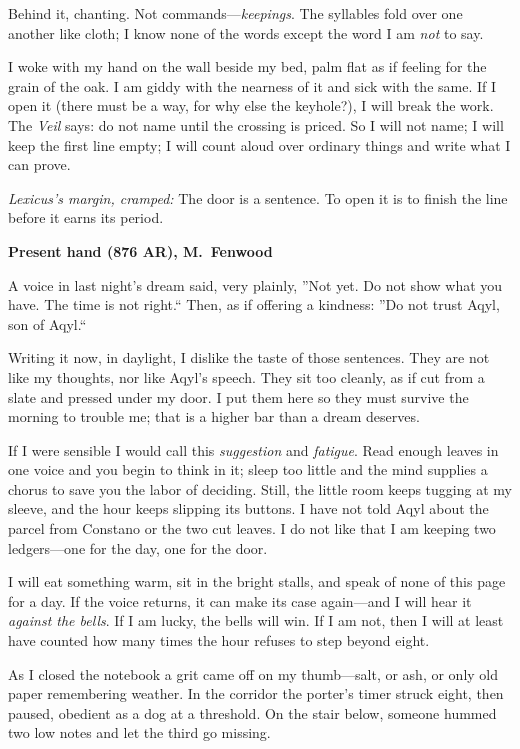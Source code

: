 \documentclass[11pt]{article}
\numberwithin{equation}{section} %
\theoremstyle{plain} %
\theoremstyle{definition} %
\theoremstyle{remark} %
\begin{document}
Behind it, chanting. Not commands---\emph{keepings}. The syllables fold over one another like cloth; I know none of the words except the word I am \emph{not} to say.

I woke with my hand on the wall beside my bed, palm flat as if feeling for the grain of the oak. I am giddy with the nearness of it and sick with the same. If I open it (there must be a way, for why else the keyhole?), I will break the work. The \textit{Veil} says: do not name until the crossing is priced. So I will not name; I will keep the first line empty; I will count aloud over ordinary things and write what I can prove.

\medskip
\noindent\textit{Lexicus's margin, cramped:} The door is a sentence. To open it is to finish the line before it earns its period.

\medskip
\noindent\textbf{Present hand (876 AR), M.\ Fenwood}

A voice in last night's dream said, very plainly, ''Not yet. Do not show what you have. The time is not right.`` Then, as if offering a kindness: ''Do not trust Aqyl, son of Aqyl.``

Writing it now, in daylight, I dislike the taste of those sentences. They are not like my thoughts, nor like Aqyl's speech. They sit too cleanly, as if cut from a slate and pressed under my door. I put them here so they must survive the morning to trouble me; that is a higher bar than a dream deserves.

If I were sensible I would call this \emph{suggestion} and \emph{fatigue}. Read enough leaves in one voice and you begin to think in it; sleep too little and the mind supplies a chorus to save you the labor of deciding. Still, the little room keeps tugging at my sleeve, and the hour keeps slipping its buttons. I have not told Aqyl about the parcel from Constano or the two cut leaves. I do not like that I am keeping two ledgers---one for the day, one for the door.

I will eat something warm, sit in the bright stalls, and speak of none of this page for a day. If the voice returns, it can make its case again---and I will hear it \emph{against the bells}. If I am lucky, the bells will win. If I am not, then I will at least have counted how many times the hour refuses to step beyond eight.

As I closed the notebook a grit came off on my thumb---salt, or ash, or only old paper remembering weather. In the corridor the porter's timer struck eight, then paused, obedient as a dog at a threshold. On the stair below, someone hummed two low notes and let the third go missing.
\end{document}
